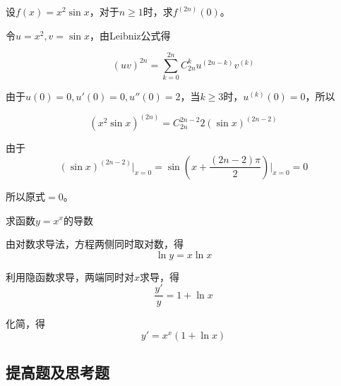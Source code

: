 \begin{problem}
	设$f(x)=x^2\sin{x}$，对于$n\geq 1$时，求$f^{(2n)}(0)$。
	
	\begin{solution}
		令$u=x^2,v=\sin{x}$，由Leibniz公式得
		
		\[(uv)^{2n}=\sum^{2n}_{k=0}C^k_{2n}u^{(2n-k)}v^{(k)}\]
		
		由于$u(0)=0,u'(0)=0,u''(0)=2$，当$k\geq 3$时，$u^{(k)}(0)=0$，所以
		
		\[(x^2\sin{x})^{(2n)}=C^{2n-2}_{2n}2(\sin{x})^{(2n-2)}\]
		
		由于
		\[(\sin{x})^{(2n-2)}\big|_{x=0}=\sin{(x+\frac{(2n-2)\pi}{2})}\Big|_{x=0}=0\]
		
		所以原式$=0$。
	\end{solution}
\end{problem}

\begin{problem}
	求函数$y=x^x$的导数
	
	\begin{solution}
		由对数求导法，方程两侧同时取对数，得
		\[\ln{y}=x\ln{x}\]
		
		利用隐函数求导，两端同时对$x$求导，得
		\[\frac{y'}{y}=1+\ln{x}\]
		
		化简，得
		\[y'=x^x(1+\ln{x})\]
	\end{solution}
\end{problem}

\subsection{提高题及思考题}

